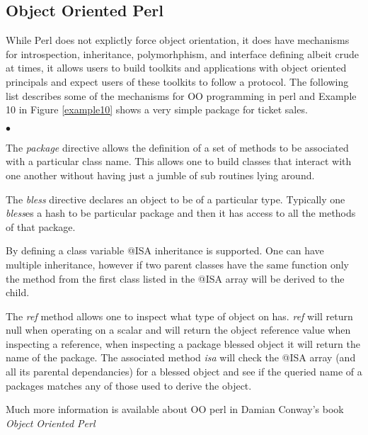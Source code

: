 \documentclass{article}
\begin{document}
\subsection{Object Oriented Perl}

While Perl does not explictly force object orientation, it does have
mechanisms for introspection, inheritance, polymorhphism, and
interface defining albeit crude at times, it allows users to build
toolkits and applications with object oriented principals and expect
users of these toolkits to follow a protocol.   The following list
describes some of the mechanisms for OO programming in perl and
Example 10 in Figure \ref{example10} shows a very simple package for
ticket sales.

\begin{list}{$\bullet$}{}

\item The {\it package} directive allows the definition of a set of methods
to be associated with a particular class name.  This allows one to
build classes that interact with one another without having just a
jumble of sub routines lying around.

\item The {\it bless} directive declares an object to be of a
particular type.  Typically one {\it bless}es a hash to be particular
package and then it has access to all the methods of that package. 

\item By defining a class variable @ISA inheritance is supported.
One can have multiple inheritance, however if two parent classes have
the same function only the method from the first class listed in the
@ISA array will be derived to the child.

\item The {\it ref} method allows one to inspect what type of object
on has.  {\it ref} will return null when operating on a scalar and
will return the object reference value when inspecting a reference,
when inspecting a package blessed object it will return the name of
the package.  The associated method {\it isa} will check the @ISA array (and
all its parental dependancies) for a blessed object and see if the
queried name of a packages matches any of those used to derive the
object.
 
\end{list}

Much more information is available about OO perl in Damian Conway's
book {\it Object Oriented Perl}
\end{document}
